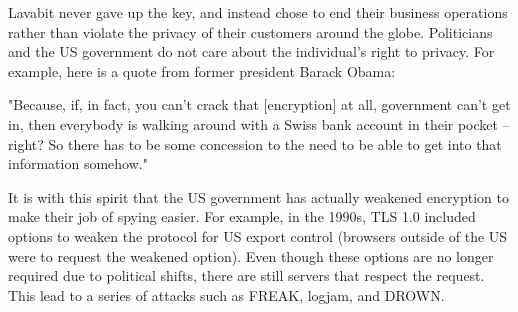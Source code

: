 \documentclass[11pt]{article} %
\begin{document}
Lavabit never gave up the key, and instead chose to end their business operations rather than violate the privacy of their customers around the globe. Politicians and the US government do not care about the individual's right to privacy. For example, here is a quote from former president Barack Obama:

"Because, if, in fact, you can’t crack that [encryption] at all, government can’t get in, then everybody is walking around with a Swiss bank account in their pocket – right? So there has to be some concession to the need to be able to get into that information somehow."


It is with this spirit that the US government has actually weakened encryption to make their job of spying easier. For example, in the 1990s, TLS 1.0 included options to weaken the protocol for US export control (browsers outside of the US were to request the weakened option). Even though these options are no longer required due to political shifts, there are still servers that respect the request. This lead to a series of attacks such as FREAK, logjam, and DROWN. 
\end{document}
